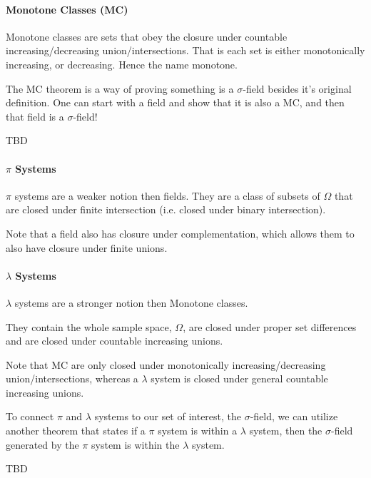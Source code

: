 \documentclass{article}
\theoremstyle{proposition}
\begin{document}
			\paragraph{Monotone Classes (MC)}
			Monotone classes are sets that obey the closure under countable increasing/decreasing union/intersections. That is each set is either monotonically increasing, or decreasing. Hence the name monotone.

			The MC theorem is a way of proving something is a $\sigma$-field besides it's original definition. One can start with a field and show that it is also a MC, and then that field is a $\sigma$-field!

			\begin{theorem}
			\label{thm:field_mc_thm}
				TBD
			\end{theorem}

			\paragraph{$\pi$ Systems}
			$\pi$ systems are a weaker notion then fields. They are a class of subsets of $\Omega$ that are closed under finite intersection (i.e. closed under binary intersection). 

			Note that a field also has closure under complementation, which allows them to also have closure under finite unions.

			\paragraph{$\lambda$ Systems}
			$\lambda$ systems are a stronger notion then Monotone classes. 

			They contain the whole sample space, $\Omega$, are closed under proper set differences and are closed under countable increasing unions. 

			Note that MC are only closed under monotonically increasing/decreasing union/intersections, whereas a $\lambda$ system is closed under general countable increasing unions.

			To connect $\pi$ and $\lambda$ systems to our set of interest, the $\sigma$-field, we can utilize another theorem that states if a $\pi$ system is within a $\lambda$ system, then the $\sigma$-field generated by the $\pi$ system is within the $\lambda$ system.

			\begin{theorem}
			\label{thm:dynkins_pi_lambda_thm}
				TBD
			\end{theorem}
\end{document}
